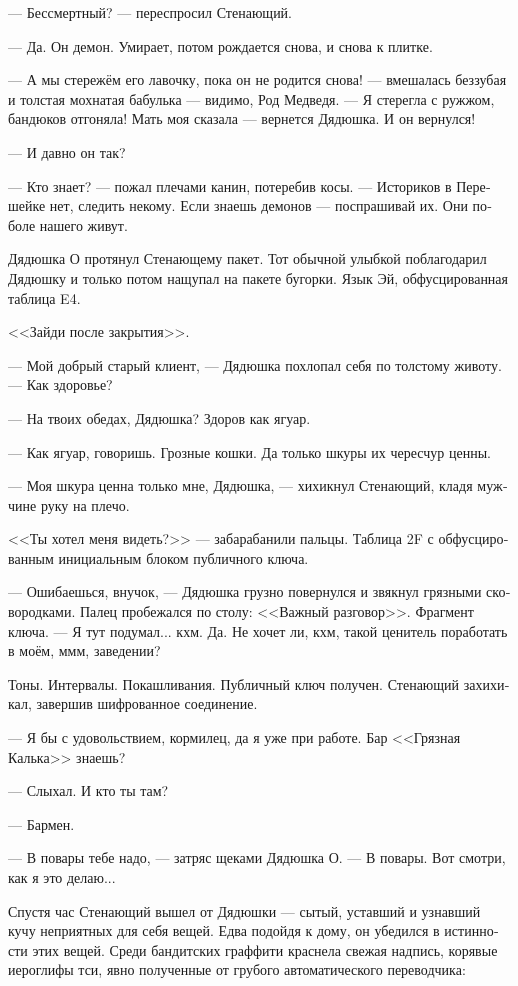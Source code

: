 \documentclass[a4paper,12pt,fleqn]{book}\usepackage{cooltooltips}\usepackage{polyglossia}\setdefaultlanguage[babelshorthands=true]{russian}\setotherlanguage{english}\defaultfontfeatures{Ligatures=TeX,Mapping=tex-text} \usepackage{xcolor}\definecolor{lightgray}{HTML}{bbbbbb}\color{lightgray}\newcommand{\ml}[3]{\textenglish{\textcolor{black}{#3}}}
\newcommand{\asterism}{\vspace{1em}{\centering\Large\bfseries$\ast~\ast~\ast$\par}\vspace{1em}}
\begin{document}
--- Бессмертный? --- переспросил Стенающий.

--- Да.
Он демон.
Умирает, потом рождается снова, и снова к плитке.

--- А мы стережём его лавочку, пока он не родится снова! --- вмешалась беззубая и толстая мохнатая бабулька --- видимо, Род Медведя.
--- Я стерегла с ружжом, бандюков отгоняла!
Мать моя сказала --- вернется Дядюшка.
И он вернулся!

--- И давно он так?

--- Кто знает? --- пожал плечами канин, потеребив косы.
--- Историков в Перешейке нет, следить некому.
Если знаешь демонов --- поспрашивай их.
Они поболе нашего живут.

\asterism

Дядюшка О протянул Стенающему пакет.
Тот обычной улыбкой поблагодарил Дядюшку и только потом нащупал на пакете бугорки.
Язык Эй, обфусцированная таблица E4.

<<Зайди после закрытия>>.

\asterism

--- Мой добрый старый клиент, --- Дядюшка похлопал себя по толстому животу.
--- Как здоровье?

--- На твоих обедах, Дядюшка?
Здоров как ягуар.

--- Как ягуар, говоришь.
Грозные кошки.
Да только шкуры их чересчур ценны.

--- Моя шкура ценна только мне, Дядюшка, --- хихикнул Стенающий, кладя мужчине руку на плечо.

<<Ты хотел меня видеть?>> --- забарабанили пальцы.
Таблица 2F с обфусцированным инициальным блоком публичного ключа.

--- Ошибаешься, внучок, --- Дядюшка грузно повернулся и звякнул грязными сковородками.
Палец пробежался по столу: <<Важный разговор>>.
Фрагмент ключа.
--- Я тут подумал... кхм.
Да.
Не хочет ли, кхм, такой ценитель поработать в моём, ммм, заведении?

Тоны.
Интервалы.
Покашливания.
Публичный ключ получен.
Стенающий захихикал, завершив шифрованное соединение.

--- Я бы с удовольствием, кормилец, да я уже при работе.
Бар <<Грязная Калька>> знаешь?

--- Слыхал.
И кто ты там?

--- Бармен.

--- В повары тебе надо, --- затряс щеками Дядюшка О.
--- В повары.
Вот смотри, как я это делаю...

Спустя час Стенающий вышел от Дядюшки --- сытый, уставший и узнавший кучу неприятных для себя вещей.
Едва подойдя к дому, он убедился в истинности этих вещей.
Среди бандитских граффити краснела свежая надпись, корявые иероглифы тси, явно полученные от грубого автоматического переводчика:
\end{document}

